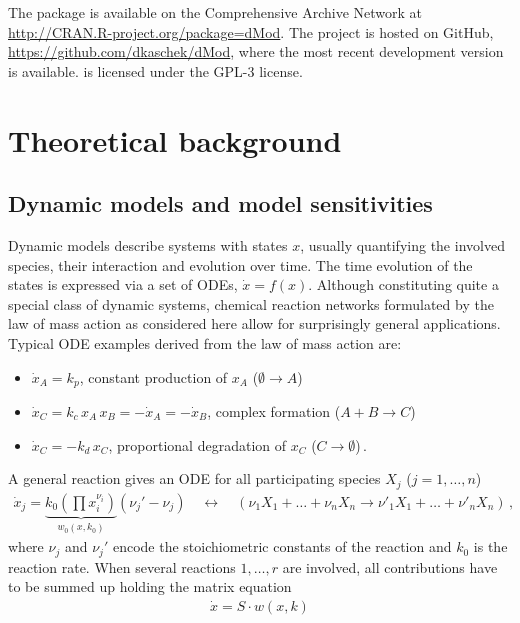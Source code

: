 \documentclass[article]{jss}
\begin{document}
The  package is available on the Comprehensive  Archive Network at \url{http://CRAN.R-project.org/package=dMod}. The project is hosted on GitHub, \url{https://github.com/dkaschek/dMod}, where the most recent development version is available.  is licensed under the GPL-3 license. 




\section{Theoretical background}
\label{sec:theory}

\subsection{Dynamic models and model sensitivities}
Dynamic models describe systems with states $x$, usually quantifying the involved species, their interaction and evolution over time. %
The time evolution of the states is expressed via a set of ODEs, $\dot x = f(x)$. Although constituting quite a special class of dynamic systems, chemical reaction networks formulated by the law of mass action as considered here allow for surprisingly general applications. Typical ODE examples derived from the law of mass action are:
\begin{itemize}
	\item $\dot x_A = k_p$, constant production of $x_A$ ($\emptyset \rightarrow A$)
	\item $\dot x_C = k_c \,x_A \,x_B = - \dot x_A = - \dot x_B$, complex formation ($A+B \rightarrow C$)
	\item $\dot x_C = - k_d \,x_C$, proportional degradation of $x_C$ ($C \rightarrow \emptyset$)\,.
\end{itemize}
A general reaction gives an ODE for all participating species $X_j$ ($j = 1, \dots, n$)
\begin{align}
	\dot x_j = \underbrace{k_0 \left(\prod x_i^{\nu_i}\right)}_{w_0(x, k_0)} (\nu_j' - \nu_j) \quad\leftrightarrow\quad (\nu_1 X_1 + \dots + \nu_n X_n \longrightarrow \nu'_1 X_1 + \dots + \nu'_n X_n)\,,
	\label{eq:ma}
\end{align}
where $\nu_j$ and $\nu_j'$ encode the stoichiometric constants of the reaction and $k_0$ is the reaction rate. When several reactions $1, \dots, r$ are involved, all contributions have to be summed up holding the matrix equation
\begin{align}
	\dot x = S\cdot w(x, k)
	\label{eq:Sv}
\end{align}
\end{document}
